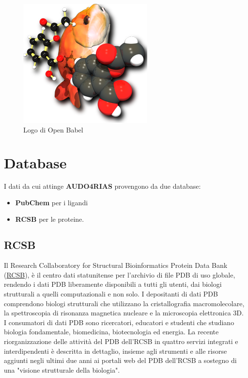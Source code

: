 \begin{figure}[H]
    \centering
    \includegraphics[scale=0.6]{immagini/capitolo2/openBabelLogo.png}
    \caption{Logo di Open Babel}
    \label{fig:open babel logo}
\end{figure}

\section{Database}
I dati da cui attinge \textbf{AUDO4RIAS} provengono da due database: 

\begin{itemize}
    \item \textbf{PubChem} per i ligandi
    \item \textbf{RCSB} per le proteine.
\end{itemize}

\subsection{RCSB}
Il Research Collaboratory for Structural Bioinformatics Protein Data Bank (\href{https://www.rcsb.org/search}{RCSB}), è il centro dati statunitense per l'archivio di file PDB di uso globale, rendendo i dati PDB liberamente disponibili a tutti gli utenti, dai biologi strutturali a quelli computazionali e non solo\cite{10.1093/nar/gkw1000}.\newline
I depositanti di dati PDB comprendono biologi strutturali che utilizzano la cristallografia macromolecolare, la spettroscopia di risonanza magnetica nucleare e la microscopia elettronica 3D. I consumatori di dati PDB sono ricercatori, educatori e studenti che studiano biologia fondamentale, biomedicina, biotecnologia ed energia. La recente riorganizzazione delle attività del PDB dell'RCSB in quattro servizi integrati e interdipendenti è descritta in dettaglio, insieme agli strumenti e alle risorse aggiunti negli ultimi due anni ai portali web del PDB dell'RCSB a sostegno di una "visione strutturale della biologia"\cite{10.1093/nar/gky1004}.

